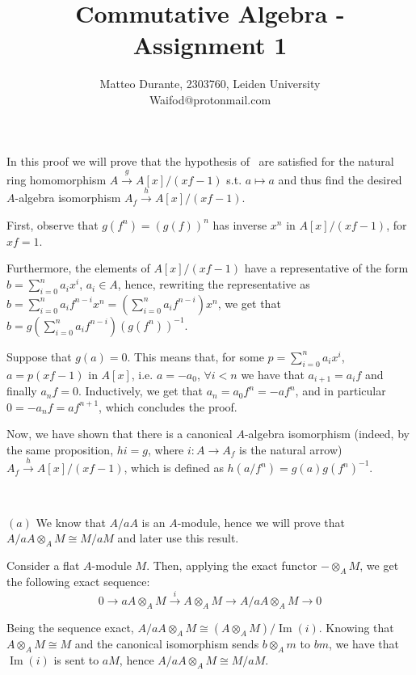 \documentclass{article}
\newcommand{\exercise}[1]{\noindent {\bf Exercise #1}}
\DeclareMathOperator{\Ima}{Im}
\begin{document}
\title{Commutative Algebra - Assignment 1}

\author{Matteo Durante, 2303760, Leiden University\\Waifod@protonmail.com}

\maketitle


\exercise{1}

In this proof we will prove that the hypothesis of~\cite[cor. 3.2]{atm} are satisfied for the natural ring homomorphism $A\xrightarrow{g} A[x]/(xf-1)$ s.t. $a\mapsto a$ and thus find the desired $A$-algebra isomorphism $A_f\xrightarrow{h} A[x]/(xf-1)$.

First, observe that $g(f^n)=(g(f))^n$ has inverse $x^n$ in $A[x]/(xf-1)$, for $xf=1$.

Furthermore, the elements of $A[x]/(xf-1)$ have a representative of the form $b=\sum_{i=0}^n a_ix^i$, $a_i\in A$, hence, rewriting the representative as $b=\sum_{i=0}^n a_if^{n-i}x^n=(\sum_{i=0}^n a_if^{n-i})x^n$, we get that $b=g(\sum_{i=0}^n a_if^{n-i})(g(f^n))^{-1}$.

Suppose that $g(a)=0$. This means that, for some $p=\sum_{i=0}^n a_ix^i$, $a=p(xf-1)$ in $A[x]$, i.e. $a=-a_0$, $\forall i<n$ we have that $a_{i+1}=a_if$ and finally $a_nf=0$. Inductively, we get that $a_n=a_0f^n=-af^n$, and in particular $0=-a_nf=af^{n+1}$, which concludes the proof.

Now, we have shown that there is a canonical $A$-algebra isomorphism (indeed, by the same proposition, $hi=g$, where $i:A\rightarrow A_f$ is the natural arrow) $A_f\xrightarrow{h} A[x]/(xf-1)$, which is defined as $h(a/f^n)=g(a)g(f^n)^{-1}$.


~\\
\exercise{2}

$(a)$ We know that $A/aA$ is an $A$-module, hence we will prove that $A/aA\otimes_A M\cong M/aM$ and later use this result.

Consider a flat $A$-module $M$. Then, applying the exact functor $-\otimes_A M$, we get the following exact sequence:
$$0\rightarrow aA\otimes_A M\xrightarrow{i} A\otimes_A M\rightarrow A/aA\otimes_A M\rightarrow 0$$

Being the sequence exact, $A/aA\otimes_A M\cong (A\otimes_A M)/\Ima(i)$. Knowing that $A\otimes_A M\cong M$ and the canonical isomorphism sends $b\otimes_A m$ to $bm$, we have that $\Ima(i)$ is sent to $aM$, hence $A/aA\otimes_A M\cong M/aM$.
\end{document}
